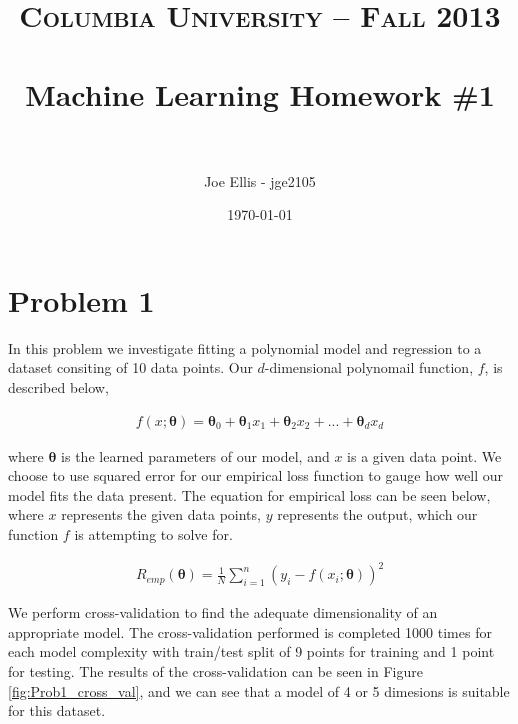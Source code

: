\documentclass[paper=a4, fontsize=11pt]{scrartcl} %
\title{	
\normalfont \normalsize 
\textsc{Columbia University -- Fall 2013} \\ [25pt] %
\horrule{0.5pt} \\[0.4cm] %
\huge Machine Learning Homework \#1\\ %
\horrule{2pt} \\[0.5cm] %
}
\author{Joe Ellis - jge2105} %
\date{\normalsize\today} %
\begin{document}
\maketitle %


\section{Problem 1}

In this problem we investigate fitting a polynomial model and regression to a dataset consiting of 10 data points.  
Our $d$-dimensional polynomail function, $f$, is described below, 

\begin{align} 
f(x;\bm{\theta}) = \bm{\theta}_{0}	+ \bm{\theta}_{1}x_{1} + \bm{\theta}_{2}x_{2} + ... + \bm{\theta}_{d}x_{d}		
\end{align}

where $\bm{\theta}$ is the learned parameters of our model, and $x$ is a given data point.
We choose to use squared error for our empirical loss function to gauge how well our model fits the data present.  The equation for empirical loss can be seen below, where $x$ represents the given data points, $y$ represents the output, which our function $f$ is attempting to solve for.

\begin{align} 
R_{emp}(\bm{\theta}) = \frac{1}{N}\sum\limits_{i=1}^n (y_{i} - f(x_{i};\bm{\theta}))^{2}
\end{align}

We perform cross-validation to find the adequate dimensionality of an appropriate model.  
The cross-validation performed is completed 1000 times for each model complexity with train/test split of 9 points for training and 1 point for testing.  The results of the cross-validation can be seen in Figure \ref{fig:Prob1_cross_val}, and we can see that a model of 4 or 5 dimesions is suitable for this dataset. 
\end{document}
